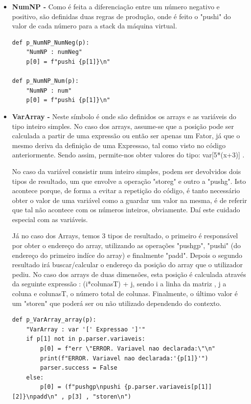 \documentclass[11pt,a4paper]{report}
\begin{document}
\begin{itemize}
\begin {verbatim}
def p_Instrucao_MenosMenos(p):
    "Instrucao : VarArray dec"
    if(len(p[1])==3):
        p[0] = p[1][0] + p[1][1] + p[1][0] + p[1][1] + "loadn\n"
		 + "pushi 1\nsub\n" + p[1][2] 
    else :
        p[0] = p[1][1] + "pushi 1\nsub\n" + p[1][0]
\end{verbatim}

\item \textbf{NumNP -} Como é feita a diferenciação entre um número negativo e positivo, são definidas duas regras de produção, onde é feito o "pushi" do valor de cada número para a stack da máquina virtual.
\begin {verbatim}
def p_NumNP_NumNeg(p):
    "NumNP : numNeg"
    p[0] = f"pushi {p[1]}\n"

def p_NumNP_Num(p):
    "NumNP : num"
    p[0] = f"pushi {p[1]}\n"
\end{verbatim}

\item \textbf{VarArray -} Neste símbolo é onde são definidos os arrays e as variáveis do tipo inteiro simples. No caso dos arrays, assume-se que a posição pode ser calculada a partir de uma expressão ou então ser apenas um Fator, já que o mesmo deriva da definição de uma Expressao, tal como visto no código anteriormente. Sendo assim, permite-nos obter valores do tipo: var[5*(x+3)] . \par
No caso da variável consistir num inteiro simples, podem ser devolvidos dois tipos de resultado, um que envolve a operação "storeg" e outro a "pushg". Isto acontece porque, de forma a evitar a repetição do código, é tanto necessário obter o valor de uma variável como a guardar um valor na mesma, é de referir que tal não acontece com os números inteiros, obviamente. Daí este cuidado especial com as variáveis.\par
Já no caso dos Arrays, temos 3 tipos de resultado, o primeiro é responsável por obter o endereço do array, utilizando as operações "pushgp", "pushi" (do endereço do primeiro indíce do array) e finalmente "padd". Depois o segundo resultado irá buscar/calcular o endereço da posição do array que o utilizador pediu. No caso dos arrays de duas dimensões, esta posição é calculada através da seguinte expressão : (i*colunasT) + j, sendo i a linha da matriz , j a coluna e colunasT, o número total de colunas. Finalmente, o último valor é um "storen" que poderá ser ou não utilizado dependendo do contexto.

\begin {verbatim}
def p_VarArray_array(p):
    "VarArray : var '[' Expressao ']'"
    if p[1] not in p.parser.variaveis:
        p[0] = f"err \"ERROR. Variavel nao declarada:\"\n"
        print(f"ERROR. Variavel nao declarada:'{p[1]}'")
        parser.success = False
    else:
        p[0] = (f"pushgp\npushi {p.parser.variaveis[p[1]][2]}\npadd\n" , p[3] , "storen\n")




\end{verbatim}
\end{itemize}
\end{document}
